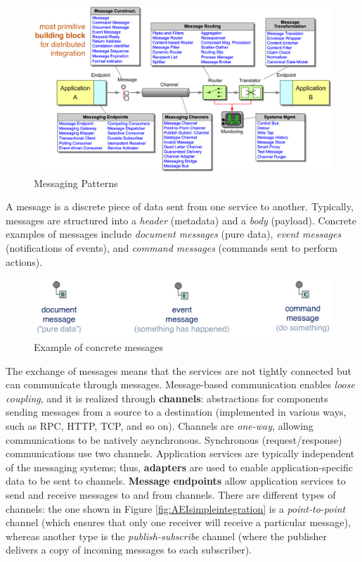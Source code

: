 \begin{figure} [H]
    \centering
    \includegraphics[width=1\textwidth]{images/SoftwareArchitecture/EIPpatterns.png}
    \caption[Caption for EAI messaging patterns]{Messaging Patterns\protect\footnotemark}
    \label{fig:EIPpatterns}
\end{figure}

A message is a discrete piece of data sent from one service to another. Typically, messages are structured into a \textit{header} (metadata) and a \textit{body} (payload). Concrete examples of messages include \emph{document messages} (pure data), \emph{event messages} (notifications of events), and \emph{command messages} (commands sent to perform actions).

\begin{figure} [H]
    \centering
    \includegraphics[width=1\textwidth]{images/SoftwareArchitecture/AEImessages.png}
    \caption{Example of concrete messages}
    \label{fig:AEImessages}
\end{figure}

The exchange of messages means that the services are not tightly connected but can communicate through messages. Message-based communication enables \emph{loose coupling}, and it is realized through \textbf{channels}: abstractions for components sending messages from a source to a destination (implemented in various ways, such as RPC, HTTP, TCP, and so on). Channels are \emph{one-way}, allowing communications to be natively asynchronous. Synchronous (request/response) communications use two channels. Application services are typically independent of the messaging systems; thus, \textbf{adapters} are used to enable application-specific data to be sent to channels. \textbf{Message endpoints} allow application services to send and receive messages to and from channels. There are different types of channels: the one shown in Figure \ref{fig:AEIsimpleintegration} is a \emph{point-to-point} channel (which ensures that only one receiver will receive a particular message), whereas another type is the \emph{publish-subscribe} channel (where the publisher delivers a copy of incoming messages to each subscriber).


